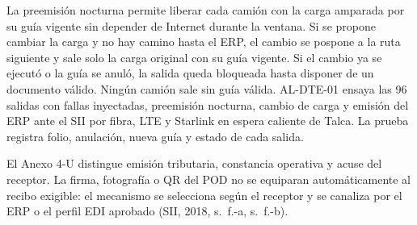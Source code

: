 La preemisión nocturna permite liberar cada camión con la carga amparada por su guía vigente sin depender de Internet durante la ventana. Si se propone cambiar la carga y no hay camino hasta el ERP, el cambio se pospone a la ruta siguiente y sale solo la carga original con su guía vigente. Si el cambio ya se ejecutó o la guía se anuló, la salida queda bloqueada hasta disponer de un documento válido. Ningún camión sale sin guía válida. AL-DTE-01 ensaya las 96 salidas con fallas inyectadas, preemisión nocturna, cambio de carga y emisión del ERP ante el SII por fibra, LTE y Starlink en espera caliente de Talca. La prueba registra folio, anulación, nueva guía y estado de cada salida.

El Anexo 4-U distingue emisión tributaria, constancia operativa y acuse del receptor. La firma, fotografía o QR del POD no se equiparan automáticamente al recibo exigible: el mecanismo se selecciona según el receptor y se canaliza por el ERP o el perfil EDI aprobado (SII, 2018, s.~f.-a, s.~f.-b).
